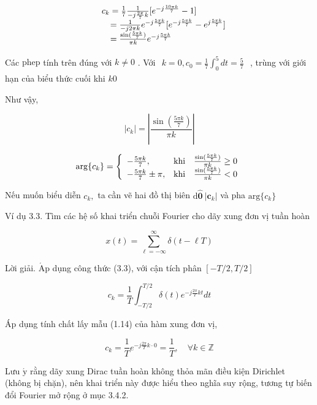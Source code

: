 \documentclass[
  10
]{article}
\begin{document}
\[
\begin{array}{r l} & {c _ {k} = \frac {1}{7} \frac {1}{- j \frac {2 \pi}{7} k} [ e ^ {- j \frac {1 0 \pi k}{7}} - 1 ]} \\ & {\quad = \frac {1}{- j 2 \pi k} e ^ {- j \frac {5 \pi k}{7}} [ e ^ {- j \frac {5 \pi k}{7}} - e ^ {j \frac {5 \pi k}{7}} ]} \\ & {\quad = \frac {\sin (\frac {5 \pi k}{7})}{\pi k} e ^ {- j \frac {5 \pi k}{7}}} \end{array}
\]

Các \(\mathrm { p h e p }\) tính trên đúng với \(k \neq 0\) . Với
\(\begin{array} { r } { k = 0 , c _ { 0 } = \frac { 1 } { 7 } \int _ { 0 } ^ { 5 } d t = \frac { 5 } { 7 } } \end{array}\)
, trùng với giới hạn của biểu thức cuối khi \(k  0\)

Như vậy,

\[
| c _ {k} | = \left| \frac {\sin (\frac {5 \pi k}{7})}{\pi k} \right|
\]

\[
\arg \{c _ {k} \} = \left\{ \begin{array}{l l} - \frac {5 \pi k}{7}, & \mathrm{khi} \quad \frac {\sin (\frac {5 \pi k}{7})}{\pi k} \geq 0 \\ - \frac {5 \pi k}{7} \pm \pi , & \mathrm{khi} \quad \frac {\sin (\frac {5 \pi k}{7})}{\pi k} <   0 \end{array} \right.
\]

Nếu muốn biểu diễn \(c _ { k } ,\) ta cần vẽ hai đồ thị biên
\(\mathrm { d } \hat { \boldsymbol { 0 } } \ \lvert \boldsymbol { c } _ { k } \rvert\)
và pha \(\mathrm { a r g } \{ c _ { k } \}\) 

Ví dụ 3.3. Tìm các hệ số khai triển chuỗi Fourier cho dãy xung đơn vị
tuần hoàn

\[
x (t) = \sum_ {\ell = - \infty} ^ {\infty} \delta (t - \ell T)
\]

Lời giải. \(\mathrm { { \acute { A } p } }\) dụng công thức (3.3), với
cận tích phân \([ - T / 2 , T / 2 ]\)

\[
c _ {k} = \frac {1}{T} \int_ {- T / 2} ^ {T / 2} \delta (t) e ^ {- j \frac {2 \pi}{T} k t} d t
\]

Áp dụng tính chất lấy mẫu (1.14) của hàm xung đơn vị,

\[
c _ {k} = \frac {1}{T} e ^ {- j \frac {2 \pi}{T} k \cdot 0} = \frac {1}{T}, \quad \forall k \in \mathbb {Z}\tag{3.5}
\]

Lưu \(\acute { \mathrm { y } }\) rằng dãy xung Dirac tuần hoàn không
thỏa mãn điều kiện Dirichlet (không bị chặn), nên khai triển này được
hiểu theo nghĩa suy rộng, tương tự biến đổi Fourier mở rộng ở mục 3.4.2.

\end{document}
